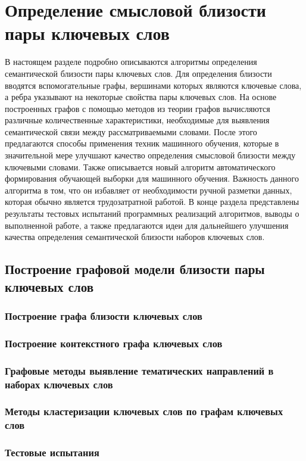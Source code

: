 \chapter{Определение смысловой близости пары ключевых слов} \label{chapt1}
В настоящем разделе подробно описываются алгоритмы определения семантической близости пары ключевых слов.
Для определения близости вводятся вспомогательные графы, вершинами которых являются ключевые слова, а ребра указывают на некоторые свойства пары ключевых слов.
На основе построенных графов с помощью методов из теории графов вычисляются различные количественные характеристики, необходимые для выявления семантической связи между рассматриваемыми словами.
После этого предлагаются способы применения техник машинного обучения, которые в значительной мере улучшают качество определения смысловой близости между ключевыми словами. 
Также описывается новый алгоритм автоматического формирования обучающей выборки для машинного обучения. Важность данного алгоритма в том, что он избавляет от необходимости ручной разметки данных, которая обычно является трудозатратной работой.
В конце раздела представлены результаты тестовых испытаний программных реализаций алгоритмов, выводы о выполненной работе, а также предлагаются идеи для дальнейшего улучшения качества определения семантической близости наборов ключевых слов.

\section{Построение графовой модели близости пары ключевых слов}
\subsection{Построение графа близости ключевых слов} %
\subsection{Построение контекстного графа ключевых слов} %
\subsection{Графовые методы выявление тематических направлений в наборах ключевых слов} %
\subsection{Методы кластеризации ключевых слов по графам ключевых слов}
\subsection{Тестовые испытания}
